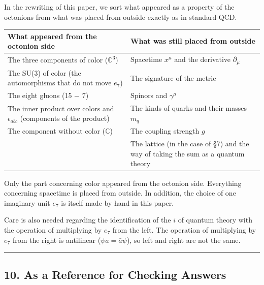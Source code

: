 \documentclass[
  a4paper,
]{article}
\newcounter{none} %
\begin{document}
In the rewriting of this paper, we sort what appeared as a property of
the octonions from what was placed from outside exactly as in standard
QCD.

{\def\LTcaptype{none} %
\begin{longtable}[]{@{}
  >{\raggedright\arraybackslash}p{}
  >{\raggedright\arraybackslash}p{}@{}}
\toprule\noalign{}
\begin{minipage}[b]{\linewidth}\raggedright
What appeared from the octonion side
\end{minipage} & \begin{minipage}[b]{\linewidth}\raggedright
What was still placed from outside
\end{minipage} \\
\midrule\noalign{}
\endhead
\bottomrule\noalign{}
\endlastfoot
The three components of color (\(\mathbb{C}^3\)) & Spacetime \(x^\mu\)
and the derivative \(\partial_\mu\) \\
The SU(3) of color (the automorphisms that do not move \(e_7\)) & The
signature of the metric \\
The eight gluons (15 − 7) & Spinors and \(\gamma^\mu\) \\
The inner product over colors and \(\epsilon_{abc}\) (components of the
product) & The kinds of quarks and their masses \(m_q\) \\
The component without color (\(\mathbb{C}\)) & The coupling strength
\(g\) \\
& The lattice (in the case of §7) and the way of taking the sum as a
quantum theory \\
\end{longtable}
}

Only the part concerning color appeared from the octonion side.
Everything concerning spacetime is placed from outside. In addition, the
choice of one imaginary unit \(e_7\) is itself made by hand in this
paper.

Care is also needed regarding the identification of the \(i\) of quantum
theory with the operation of multiplying by \(e_7\) from the left. The
operation of multiplying by \(e_7\) from the right is antilinear
(\(\psi a = \bar a\psi\)), so left and right are not the same.

\begin{center}\rule{0.5\linewidth}{0.5pt}\end{center}

\subsection{10. As a Reference for Checking
Answers}\label{as-a-reference-for-checking-answers}
\end{document}
